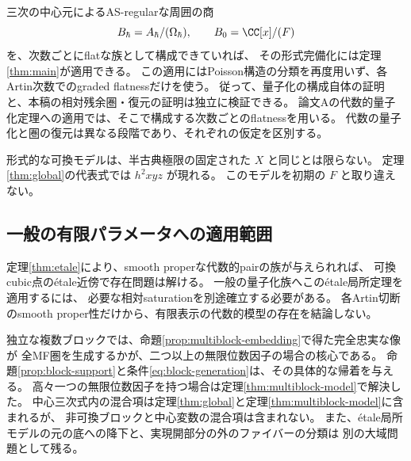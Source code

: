 三次の中心元によるAS-regularな周囲の商
\[
 B_\hbar=A_\hbar/(\Omega_\hbar),\qquad B_0=\CC[x]/(F)
\]
を、次数ごとにflatな族として構成できていれば、
その形式完備化には定理\ref{thm:main}が適用できる。
この適用にはPoisson構造の分類を再度用いず、各Artin次数でのgraded flatnessだけを使う。
従って、量子化の構成自体の証明と、本稿の相対残余圏・復元の証明は独立に検証できる。
論文Aの代数的量子化定理への適用では、そこで構成する次数ごとのflatnessを用いる。
代数の量子化と圏の復元は異なる段階であり、それぞれの仮定を区別する。

形式的な可換モデルは、半古典極限の固定された \(X\) と同じとは限らない。
定理\ref{thm:global}の代表式では \(h^2xyz\) が現れる。
このモデルを初期の \(F\) と取り違えない。

\subsection{一般の有限パラメータへの適用範囲}

定理\ref{thm:etale}により、smooth properな代数的pairの族が与えられれば、
可換cubic点のétale近傍で存在問題は解ける。
一般の量子化族へこのétale局所定理を適用するには、
必要な相対saturationを別途確立する必要がある。
各Artin切断のsmooth proper性だけから、有限表示の代数的模型の存在を結論しない。

独立な複数ブロックでは、命題\ref{prop:multiblock-embedding}で得た完全忠実な像が
全MF圏を生成するかが、二つ以上の無限位数因子の場合の核心である。
命題\ref{prop:block-support}と条件\eqref{eq:block-generation}は、その具体的な帰着を与える。
高々一つの無限位数因子を持つ場合は定理\ref{thm:multiblock-model}で解決した。
中心三次式内の混合項は定理\ref{thm:global}と定理\ref{thm:multiblock-model}に含まれるが、
非可換ブロックと中心変数の混合項は含まれない。
また、étale局所モデルの元の底への降下と、実現開部分の外のファイバーの分類は
別の大域問題として残る。

